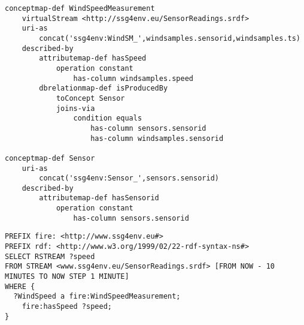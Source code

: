 \begin{lstlisting}[style=R2OStyle,language=R2O,frame=none,float,label=list:s2o-wind-ex,caption=\stwoo mapping from the data stream \textsf{windsamples} to the ontology concepts $WindSpeedMeasurement$.]
conceptmap-def WindSpeedMeasurement
	virtualStream <http://ssg4env.eu/SensorReadings.srdf>
	uri-as
		concat('ssg4env:WindSM_',windsamples.sensorid,windsamples.ts)
	described-by
		attributemap-def hasSpeed
			operation constant
				has-column windsamples.speed
		dbrelationmap-def isProducedBy
			toConcept Sensor
			joins-via
				condition equals
					has-column sensors.sensorid
					has-column windsamples.sensorid

conceptmap-def Sensor
	uri-as
		concat('ssg4env:Sensor_',sensors.sensorid)
	described-by
		attributemap-def hasSensorid
			operation constant
				has-column sensors.sensorid
\end{lstlisting}

\begin{lstlisting}[style=SPARQLSTRStyle,language=SPARQLSTR,frame=none,float,label=list:query-example,caption=\sparqlstr query which every minute returns the wind speed for the last ten minutes.]
PREFIX fire: <http://www.ssg4env.eu#>
PREFIX rdf: <http://www.w3.org/1999/02/22-rdf-syntax-ns#>
SELECT RSTREAM ?speed
FROM STREAM <www.ssg4env.eu/SensorReadings.srdf> [FROM NOW - 10 MINUTES TO NOW STEP 1 MINUTE]
WHERE {
  ?WindSpeed a fire:WindSpeedMeasurement;
    fire:hasSpeed ?speed;
}
\end{lstlisting}



